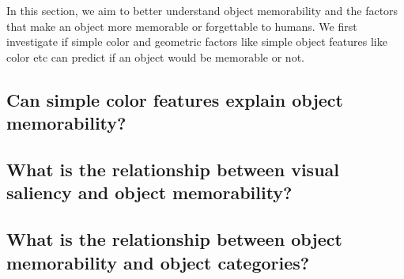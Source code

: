 In this section, we aim to better understand object memorability and the factors that make an object more memorable or forgettable to humans. We first investigate if simple color and geometric factors like simple object features like color etc can predict if an object would be memorable or not. 

\subsection{Can simple color features explain object memorability?}



\subsection{What is the relationship between visual saliency and object memorability?}



\subsection{What is the relationship between object memorability and object categories?}

